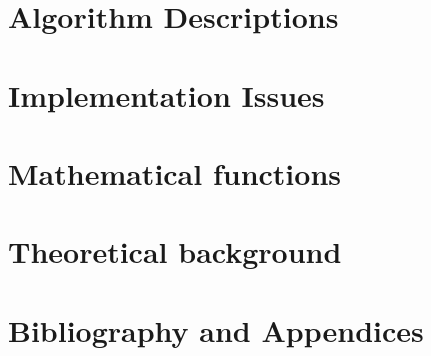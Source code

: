 \tableofcontents

\cleardoublepage
{}
     

%
%



%
\part{Algorithm Descriptions}


%



%
%
%
% 
\part{Implementation Issues}


\part{Mathematical functions}



\part{Theoretical background}



%
%


%
\part{Bibliography and Appendices}
%

%
%
\begin{appendix}





%  
%  

\end{appendix}


%
%
\printindex






